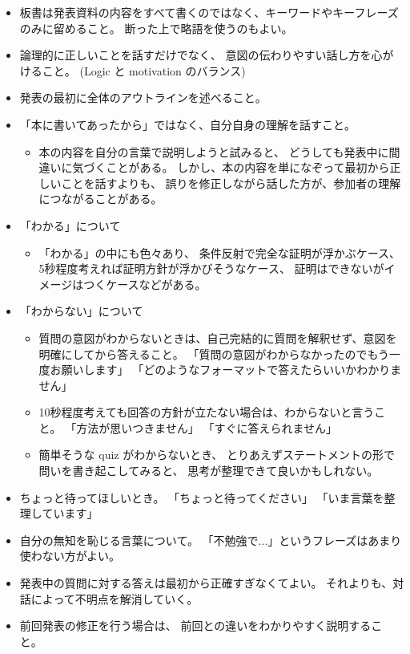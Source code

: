 \documentclass[report, notitlepage]{jlreq}
\begin{document}
\begin{itemize}
    \item 板書は発表資料の内容をすべて書くのではなく、キーワードやキーフレーズのみに留めること。
        断った上で略語を使うのもよい。
    \item 論理的に正しいことを話すだけでなく、
        意図の伝わりやすい話し方を心がけること。
        (Logic と motivation のバランス)
    \item 発表の最初に全体のアウトラインを述べること。
    \item 「本に書いてあったから」ではなく、自分自身の理解を話すこと。
        \begin{itemize}
            \item 本の内容を自分の言葉で説明しようと試みると、
                どうしても発表中に間違いに気づくことがある。
                しかし、本の内容を単になぞって最初から正しいことを話すよりも、
                誤りを修正しながら話した方が、参加者の理解につながることがある。
        \end{itemize}
    \item 「わかる」について
        \begin{itemize}
            \item 「わかる」の中にも色々あり、
                条件反射で完全な証明が浮かぶケース、
                5秒程度考えれば証明方針が浮かびそうなケース、
                証明はできないがイメージはつくケースなどがある。
        \end{itemize}
    \item 「わからない」について
        \begin{itemize}
            \item 質問の意図がわからないときは、自己完結的に質問を解釈せず、意図を明確にしてから答えること。
                「質問の意図がわからなかったのでもう一度お願いします」
                「どのようなフォーマットで答えたらいいかわかりません」
            \item 10秒程度考えても回答の方針が立たない場合は、わからないと言うこと。
                「方法が思いつきません」
                「すぐに答えられません」
            \item 簡単そうな quiz がわからないとき、
                とりあえずステートメントの形で問いを書き起こしてみると、
                思考が整理できて良いかもしれない。
        \end{itemize}
    \item ちょっと待ってほしいとき。
        「ちょっと待ってください」
        「いま言葉を整理しています」
    \item 自分の無知を恥じる言葉について。
        「不勉強で...」というフレーズはあまり使わない方がよい。
    \item 発表中の質問に対する答えは最初から正確すぎなくてよい。
        それよりも、対話によって不明点を解消していく。
    \item 前回発表の修正を行う場合は、
        前回との違いをわかりやすく説明すること。
\end{itemize}
\end{document}
